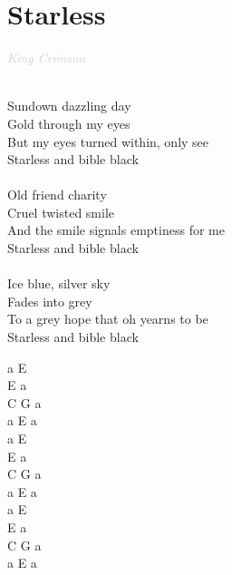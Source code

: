 \documentclass[a5paper, 10pt]{book}
\begin{document}
\newpage
\section{Starless}\textcolor{lightgray}{\textit{King Crimson}}\\~\\
\begin{minipage}[t]{0.65\textwidth}
Sundown dazzling day\\
Gold through my eyes\\
But my eyes turned within, only see\\
Starless and bible black\\
\\
Old friend charity\\
Cruel twisted smile\\
And the smile signals emptiness for me\\
Starless and bible black\\
\\
Ice blue, silver sky\\
Fades into grey\\
To a grey hope that oh yearns to be\\
Starless and bible black\\
\end{minipage}
\begin{minipage}[t]{0.35\textwidth}
a E \\
E a \\
C G a\\
a E a\\

a E \\
E a \\
C G a\\
a E a\\

a E \\
E a \\
C G a\\
a E a\\
\end{minipage}

\newpage
\end{document}
